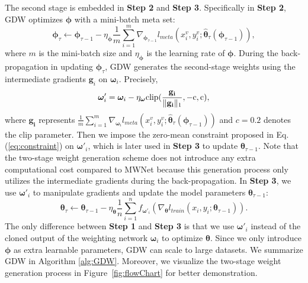 %
The second stage is embedded in \textbf{Step 2} and \textbf{Step 3}.
%
Specifically in \textbf{Step 2}, GDW optimizes $\boldsymbol \phi$ with a mini-batch meta set:
\begin{equation}
    \label{eq:phi}
    \boldsymbol \phi _{\tau} \leftarrow \boldsymbol \phi _{\tau-1} - \eta_{\boldsymbol \phi} \frac{1}{m} \sum_{i=1}^{m} \nabla_{\boldsymbol \phi _{\tau-1}} l_{meta}(x_i^v, y_i^v;\hat{\boldsymbol \theta} _\tau(\boldsymbol \phi_{\tau-1})),
\end{equation}
where $m$ is the mini-batch size and $\eta_{\boldsymbol \phi}$ is the learning rate of $\boldsymbol \phi$. 
%
During the back-propagation in updating $\boldsymbol \phi_\tau$, GDW generates the second-stage weights using the intermediate gradients $\mathbf g_i$ on $\boldsymbol \omega_i$. 
%
Precisely,
\begin{equation}
    \label{eq:newOmega}
    \boldsymbol \omega'_i = \boldsymbol \omega_i - \eta_{\boldsymbol\omega}  \rm{clip}(\frac{\mathbf{g_i}}{\|\mathbf{g_i}\|_1}, -c, c),
\end{equation}
where $\mathbf{g_i}$ represents $\frac{1}{m}\sum_{i=1}^m\nabla_{\boldsymbol\omega_i} l_{meta}(x_i^v, y_i^v;\hat{\boldsymbol \theta}_\tau(\boldsymbol \phi_{\tau-1}))$ and $c=0.2$ denotes the clip parameter.
%
Then we impose the zero-mean constraint proposed in Eq. (\ref{eq:constraint}) on $\boldsymbol \omega'_i$, which is later used in \textbf{Step 3} to update $\boldsymbol \theta_{\tau-1}$.
%
Note that the two-stage weight generation scheme does not introduce any extra computational cost compared to MWNet because this generation process only utilizes the intermediate gradients during the back-propagation.
%
In \textbf{Step 3}, we use $\boldsymbol \omega'_i$ to manipulate gradients and update the model parameters $\boldsymbol \theta_{\tau-1}$:
\begin{equation}
    \label{eq:newTheta}
    \boldsymbol \theta_\tau \leftarrow\boldsymbol \theta_{\tau-1} - \eta_{\boldsymbol \theta} \frac{1}{n} \sum_{i=1}^{n} f_{\boldsymbol \omega'_{i}}\left(\nabla_{\boldsymbol \theta} l_{train}(x_i, y_i;\boldsymbol \theta_{\tau-1})\right).
\end{equation}
%
The only difference between \textbf{Step 1} and \textbf{Step 3} is that we use $\boldsymbol \omega'_i$ instead of the cloned output of the weighting network $\boldsymbol \omega_i$ to optimize $\boldsymbol \theta$.
%
Since we only introduce $\boldsymbol \phi$ as extra learnable parameters, GDW can scale to large datasets.
%
We summarize GDW in Algorithm \ref{alg:GDW}.
%
Moreover, we visualize the two-stage weight generation process in Figure~\ref{fig:flowChart} for better demonstration.

